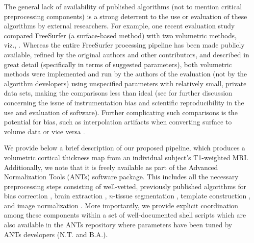 

The general lack of availability of published
algorithms \citep{kovacevic2006} (not to mention critical preprocessing
components) is a strong deterrent to the use or evaluation of these algorithms
by external researchers.  For example, one recent evaluation
study \citep{clarkson2011} compared
FreeSurfer (a surface-based method) with two volumetric methods, viz., \cite{jones2000,das2009}.
Whereas the entire FreeSurfer processing pipeline has been made publicly available, 
refined by the original authors and other contributors, and described in great detail 
(specifically in terms of suggested parameters), both volumetric methods were
implemented and run by the authors of the evaluation (not by the algorithm developers)
using unspecified parameters with relatively small, private data sets,
making the comparisons less than ideal (see \cite{tustison2013} for further discussion
concerning the issue of instrumentation bias and scientific reproducibility in the use and evaluation of software).
Further complicating such comparisons is the potential for bias, such as interpolation artifacts when
converting surface to volume data or vice versa \citep{klein2010}.

We provide below a brief description of our proposed pipeline, which produces a volumetric
cortical thickness map from an individual subject's T1-weighted MRI.
Additionally, we note that it is freely available as part of the Advanced Normalization Tools
(ANTs) software package.
This includes all the necessary preprocessing steps consisting
of well-vetted, previously published algorithms for bias correction \citep{tustison2010},
brain extraction \citep{avants2010a}, $n$-tissue segmentation \citep{avants2011a},
template construction \citep{avants2010}, and image normalization \citep{avants2011}.
More importantly, we provide explicit coordination among
these components within a set of well-documented shell scripts%
which are also available in the ANTs repository where parameters have been tuned
by ANTs developers (N.T. and B.A.).  

